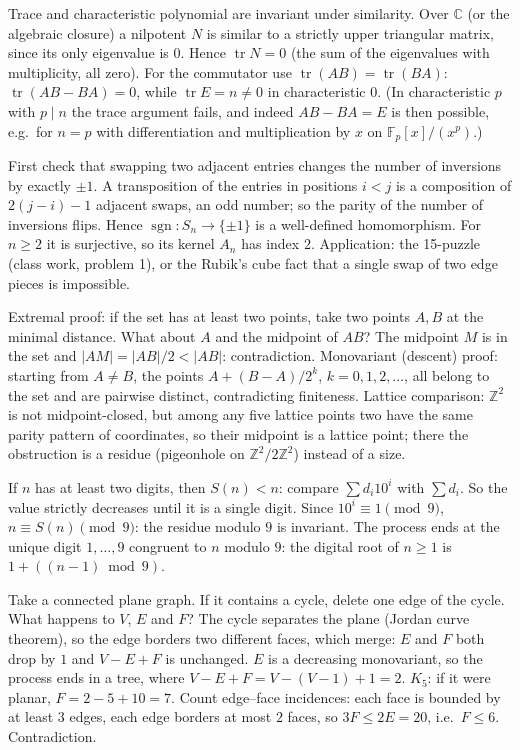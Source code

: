 \documentclass[11pt,a4paper]{article}
\begin{document}
 Trace and characteristic polynomial are invariant under similarity. Over $\mathbb C$ (or the algebraic closure) a nilpotent $N$ is similar to a strictly upper triangular matrix, since its only eigenvalue is $0$.
 Hence $\operatorname{tr}N=0$ (the sum of the eigenvalues with multiplicity, all zero). For the commutator use $\operatorname{tr}(AB)=\operatorname{tr}(BA)$: $\operatorname{tr}(AB-BA)=0$, while $\operatorname{tr}E=n\ne0$ in characteristic $0$.
 (In characteristic $p$ with $p\mid n$ the trace argument fails, and indeed $AB-BA=E$ is then possible, e.g.\ for $n=p$ with differentiation and multiplication by $x$ on $\mathbb F_p[x]/(x^p)$.)

 First check that swapping two adjacent entries changes the number of inversions by exactly $\pm1$.
 A transposition of the entries in positions $i<j$ is a composition of $2(j-i)-1$ adjacent swaps, an odd number; so the parity of the number of inversions flips. Hence $\operatorname{sgn}\colon S_n\to\{\pm1\}$ is a well-defined homomorphism.
 For $n\ge2$ it is surjective, so its kernel $A_n$ has index $2$. Application: the 15-puzzle (class work, problem 1), or the Rubik's cube fact that a single swap of two edge pieces is impossible.

 Extremal proof: if the set has at least two points, take two points $A,B$ at the minimal distance. What about $A$ and the midpoint of $AB$?
 The midpoint $M$ is in the set and $|AM|=|AB|/2<|AB|$: contradiction. Monovariant (descent) proof: starting from $A\ne B$, the points $A+(B-A)/2^k$, $k=0,1,2,\dots$, all belong to the set and are pairwise distinct, contradicting finiteness.
 Lattice comparison: $\mathbb Z^2$ is not midpoint-closed, but among any five lattice points two have the same parity pattern of coordinates, so their midpoint is a lattice point; there the obstruction is a residue (pigeonhole on $\mathbb Z^2/2\mathbb Z^2$) instead of a size.

 If $n$ has at least two digits, then $S(n)<n$: compare $\sum d_i10^i$ with $\sum d_i$. So the value strictly decreases until it is a single digit.
 Since $10^i\equiv1\pmod9$, $n\equiv S(n)\pmod9$: the residue modulo $9$ is invariant.
 The process ends at the unique digit $1,\dots,9$ congruent to $n$ modulo $9$: the digital root of $n\ge1$ is $1+((n-1)\bmod9)$.

 Take a connected plane graph. If it contains a cycle, delete one edge of the cycle. What happens to $V$, $E$ and $F$?
 The cycle separates the plane (Jordan curve theorem), so the edge borders two different faces, which merge: $E$ and $F$ both drop by $1$ and $V-E+F$ is unchanged. $E$ is a decreasing monovariant, so the process ends in a tree, where $V-E+F=V-(V-1)+1=2$.
 $K_5$: if it were planar, $F=2-5+10=7$. Count edge--face incidences: each face is bounded by at least $3$ edges, each edge borders at most $2$ faces, so $3F\le2E=20$, i.e.\ $F\le6$. Contradiction.
\end{document}
